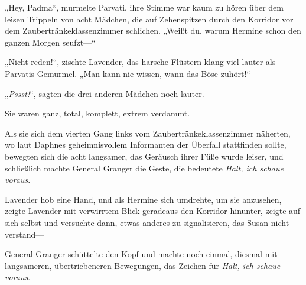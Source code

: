 „Hey, Padma“, murmelte Parvati, ihre Stimme war kaum zu hören über dem leisen Trippeln von acht Mädchen, die auf Zehenspitzen durch den Korridor vor dem Zaubertränkeklassenzimmer schlichen. „Weißt du, warum Hermine schon den ganzen Morgen seufzt—“

„Nicht reden!“, zischte Lavender, das harsche Flüstern klang viel lauter als Parvatis Gemurmel. „Man kann nie wissen, wann das Böse zuhört!“

„\emph{Pssst!}“, sagten die drei anderen Mädchen noch lauter.

Sie waren ganz, total, komplett, extrem verdammt.

Als sie sich dem vierten Gang links vom Zaubertränkeklassenzimmer näherten, wo laut Daphnes geheimnisvollem Informanten der Überfall stattfinden sollte, bewegten sich die acht langsamer, das Geräusch ihrer Füße wurde leiser, und schließlich machte General Granger die Geste, die bedeutete \emph{Halt, ich schaue voraus}.

Lavender hob eine Hand, und als Hermine sich umdrehte, um sie anzusehen, zeigte Lavender mit verwirrtem Blick geradeaus den Korridor hinunter, zeigte auf sich selbst und versuchte dann, etwas anderes zu signalisieren, das Susan nicht verstand—

General Granger schüttelte den Kopf und machte noch einmal, diesmal mit langsameren, übertriebeneren Bewegungen, das Zeichen für \emph{Halt, ich schaue voraus}.


